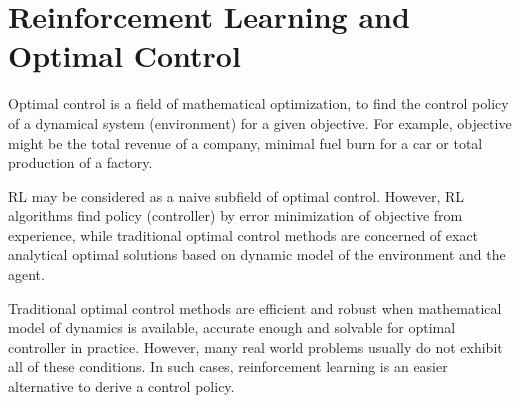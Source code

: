 \section{Reinforcement Learning and Optimal Control}
\label{sec:rl_and_control}

Optimal control is a field of mathematical optimization, to find the control policy of a dynamical system (environment) for a given objective. 
For example, objective might be the total revenue of a company, 
minimal fuel burn for a car or total production of a factory. 

RL may be considered as a naive subfield of optimal control. 
However, RL algorithms find policy (controller) by error minimization of objective from experience, 
while traditional optimal control methods are concerned of exact analytical optimal solutions based on dynamic model of the environment and the agent. 

Traditional optimal control methods are efficient and robust when mathematical model of dynamics is available, 
accurate enough and solvable for optimal controller in practice. 
However, many real world problems usually do not exhibit all of these conditions. 
In such cases, reinforcement learning is an easier alternative to derive a control policy.
